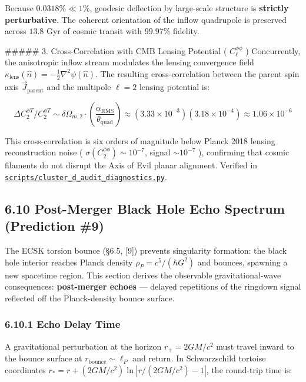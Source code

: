 \documentclass[11pt,a4paper]{article}
\theoremstyle{definition}
\theoremstyle{remark}
\begin{document}
Because $0.0318\% \ll 1\%$, geodesic deflection by large-scale structure is \textbf{strictly perturbative}. The coherent orientation of the inflow quadrupole is preserved across $13.8$ Gyr of cosmic transit with $99.97\%$ fidelity.

\#\#\#\#\# 3. Cross-Correlation with CMB Lensing Potential ( $C_\ell^{\phi\phi}$ )
Concurrently, the anisotropic inflow stream modulates the lensing convergence field $\kappa_{\text{lens}}(\hat{n}) = -\frac{1}{2}\nabla^2\psi(\hat{n})$.
The resulting cross-correlation between the parent spin axis $\vec{J}_{\text{parent}}$ and the multipole $\ell = 2$ lensing potential is:


\begin{equation}
\Delta C_2^{\phi T} / C_2^{\phi T} \sim \delta\Omega_{m, 2} \cdot \left(\frac{\alpha_{\text{RMS}}}{\theta_{\text{quad}}}\right) \approx (3.33 \times 10^{-3})(3.18 \times 10^{-4}) \approx 1.06 \times 10^{-6}
\end{equation}


This cross-correlation is six orders of magnitude below Planck 2018 lensing reconstruction noise ( $\sigma(C_2^{\phi\phi}) \sim 10^{-7}$, signal $\sim 10^{-7}$ ), confirming that cosmic filaments do not disrupt the Axis of Evil planar alignment. Verified in \href{../../scripts/cluster_d_audit_diagnostics.py}{\texttt{scripts/cluster_d_audit_diagnostics.py}}.

\subsection{6.10 Post-Merger Black Hole Echo Spectrum (Prediction \#9)}

The ECSK torsion bounce (\S 6.5, [9]) prevents singularity formation: the black hole interior reaches Planck density $\rho_P = c^5/(\hbar G^2)$ and bounces, spawning a new spacetime region. This section derives the observable gravitational-wave consequences: \textbf{post-merger echoes} — delayed repetitions of the ringdown signal reflected off the Planck-density bounce surface.

\subsubsection{6.10.1 Echo Delay Time}

A gravitational perturbation at the horizon $r_+ = 2GM/c^2$ must travel inward to the bounce surface at $r_{\text{bounce}} \sim \ell_P$ and return. In Schwarzschild tortoise coordinates $r_* = r + (2GM/c^2)\ln|r/(2GM/c^2) - 1|$, the round-trip time is:
\end{document}
